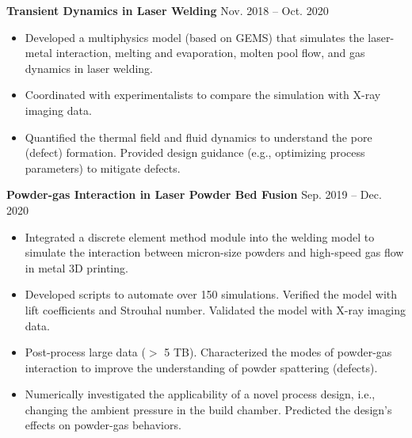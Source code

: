 \documentclass[11pt, letterpaper]{article}
\begin{document}
\vspace{3pt}

\textbf{Transient Dynamics in Laser Welding} \hfill Nov. 2018 -- Oct. 2020
\begin{itemize}[leftmargin=*, labelsep=5mm]
   \item Developed a multiphysics model (based on GEMS) that simulates the laser-metal interaction,
      melting and evaporation, molten pool flow, and gas dynamics in laser welding.
   \item Coordinated with experimentalists to compare the simulation with
      X-ray imaging data.
   \item Quantified the thermal field and fluid dynamics to understand the pore (defect) formation.
      Provided design guidance (e.g., optimizing process parameters) to mitigate defects.
\end{itemize}

\vspace{3pt}
\textbf{Powder-gas Interaction in Laser Powder Bed Fusion} \hfill Sep. 2019 -- Dec. 2020
\begin{itemize}[leftmargin=*, labelsep=5mm]
   \item Integrated a discrete element method module into the welding model to simulate the
      interaction between micron-size powders and high-speed gas flow in metal 3D printing.
   \item Developed scripts to automate over 150 simulations. Verified the model with lift
      coefficients and Strouhal number. Validated the model with X-ray imaging data.
   \item Post-process large data ($>$ 5 TB). Characterized the modes of powder-gas interaction to
      improve the understanding of powder spattering (defects).
   \item Numerically investigated the applicability of a novel process design, i.e., changing the
      ambient pressure in the build chamber. Predicted the design's effects on powder-gas behaviors.
\end{itemize}

\vspace{3pt}

\end{document}
